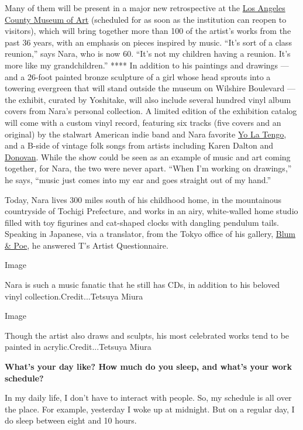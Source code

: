 Many of them will be present in a major new retrospective at the
\href{https://www.lacma.org/art/exhibition/yoshitomo-nara}{Los Angeles
County Museum of Art} (scheduled for as soon as the institution can
reopen to visitors), which will bring together more than 100 of the
artist's works from the past 36 years, with an emphasis on pieces
inspired by music. ``It's sort of a class reunion,'' says Nara, who is
now 60. ``It's not my children having a reunion. It's more like my
grandchildren.'' **** In addition to his paintings and drawings --- and
a 26-foot painted bronze sculpture of a girl whose head sprouts into a
towering evergreen that will stand outside the museum on Wilshire
Boulevard --- the exhibit, curated by Yoshitake, will also include
several hundred vinyl album covers from Nara's personal collection. A
limited edition of the exhibition catalog will come with a custom vinyl
record, featuring six tracks (five covers and an original) by the
stalwart American indie band and Nara favorite
\href{https://www.nytimes.com/2015/08/25/t-magazine/yo-la-tengo-ira-kaplan-inspirations.html}{Yo
La Tengo}, and a B-side of vintage folk songs from artists including
Karen Dalton and
\href{https://www.nytimes.com/2014/06/11/arts/music/donovan-to-enter-songwriters-hall-of-fame.html}{Donovan}.
While the show could be seen as an example of music and art coming
together, for Nara, the two were never apart. ``When I'm working on
drawings,'' he says, ``music just comes into my ear and goes straight
out of my hand.''

Today, Nara lives 300 miles south of his childhood home, in the
mountainous countryside of Tochigi Prefecture, and works in an airy,
white-walled home studio filled with toy figurines and cat-shaped clocks
with dangling pendulum tails. Speaking in Japanese, via a translator,
from the Tokyo office of his gallery,
\href{https://www.blumandpoe.com/}{Blum \& Poe}, he answered T's Artist
Questionnaire.

Image

Nara is such a music fanatic that he still has CDs, in addition to his
beloved vinyl collection.Credit...Tetsuya Miura

Image

Though the artist also draws and sculpts, his most celebrated works tend
to be painted in acrylic.Credit...Tetsuya Miura

\textbf{What's your day like? How much do you sleep, and what's your
work schedule?}

In my daily life, I don't have to interact with people. So, my schedule
is all over the place. For example, yesterday I woke up at midnight. But
on a regular day, I do sleep between eight and 10 hours.

